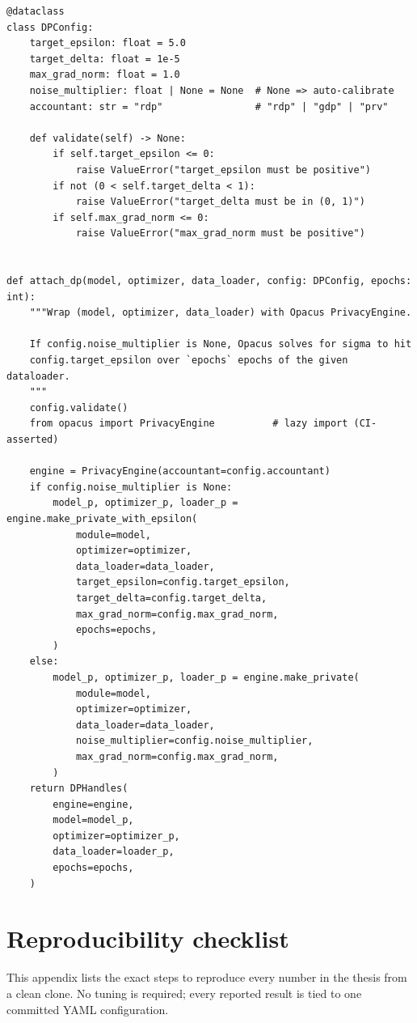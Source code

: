 \documentclass[11pt,a4paper]{report}
\begin{document}
\begin{verbatim}
@dataclass
class DPConfig:
    target_epsilon: float = 5.0
    target_delta: float = 1e-5
    max_grad_norm: float = 1.0
    noise_multiplier: float | None = None  # None => auto-calibrate
    accountant: str = "rdp"                # "rdp" | "gdp" | "prv"

    def validate(self) -> None:
        if self.target_epsilon <= 0:
            raise ValueError("target_epsilon must be positive")
        if not (0 < self.target_delta < 1):
            raise ValueError("target_delta must be in (0, 1)")
        if self.max_grad_norm <= 0:
            raise ValueError("max_grad_norm must be positive")


def attach_dp(model, optimizer, data_loader, config: DPConfig, epochs: int):
    """Wrap (model, optimizer, data_loader) with Opacus PrivacyEngine.

    If config.noise_multiplier is None, Opacus solves for sigma to hit
    config.target_epsilon over `epochs` epochs of the given dataloader.
    """
    config.validate()
    from opacus import PrivacyEngine          # lazy import (CI-asserted)

    engine = PrivacyEngine(accountant=config.accountant)
    if config.noise_multiplier is None:
        model_p, optimizer_p, loader_p = engine.make_private_with_epsilon(
            module=model,
            optimizer=optimizer,
            data_loader=data_loader,
            target_epsilon=config.target_epsilon,
            target_delta=config.target_delta,
            max_grad_norm=config.max_grad_norm,
            epochs=epochs,
        )
    else:
        model_p, optimizer_p, loader_p = engine.make_private(
            module=model,
            optimizer=optimizer,
            data_loader=data_loader,
            noise_multiplier=config.noise_multiplier,
            max_grad_norm=config.max_grad_norm,
        )
    return DPHandles(
        engine=engine,
        model=model_p,
        optimizer=optimizer_p,
        data_loader=loader_p,
        epochs=epochs,
    )
\end{verbatim}

\chapter{Reproducibility checklist}\label{app:repro}

This appendix lists the exact steps to reproduce every number in the
thesis from a clean clone. No tuning is required; every reported
result is tied to one committed YAML configuration.
\end{document}
